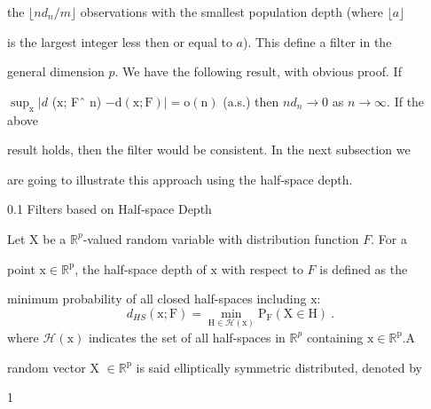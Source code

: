 \documentclass[a4paper,12pt]{article}
\begin{document}
the $\lfloor nd_{n}/m\rfloor$ observations with the smallest population depth (where $\lfloor a\rfloor$

is the largest integer less then or equal to $a$). This define a filter in the

general dimension $p$. We have the following result, with obvious proof. If

$\displaystyle \sup_{\mathrm{x}}|d$ ($\mathrm{x}$; Fˆ $\mathrm{n}$) $-\mathrm{d}(\mathrm{x};\mathrm{F})|=\mathrm{o}(\mathrm{n})$ (a.s.) then $nd_{n}\rightarrow 0$ as $ n\rightarrow\infty$. If the above

result holds, then the filter would be consistent. In the next subsection we

are going to illustrate this approach using the half-space depth.

0.1 Filters based on Half-space Depth

Let X be a $\mathbb{R}^{p}$-valued random variable with distribution function $F$. For a

point $\mathrm{x}\in \mathbb{R}^{\mathrm{p}}$, the half-space depth of $\mathrm{x}$ with respect to $F$ is defined as the

minimum probability of all closed half-spaces including $\mathrm{x}$:
$$
d_{HS}(\mathrm{x};\mathrm{F})=\min_{\mathrm{H}\in \mathcal{H}(\mathrm{x})}\mathrm{P}_{\mathrm{F}}(\mathrm{X}\in \mathrm{H})\ .
$$
where $\mathcal{H}(\mathrm{x})$ indicates the set of all half-spaces in $\mathbb{R}^{p}$ containing $\mathrm{x}\in \mathbb{R}^{\mathrm{p}}. \mathrm{A}$

random vector X $\in \mathbb{R}^{\mathrm{p}}$ is said elliptically symmetric distributed, denoted by

1
\end{document}
